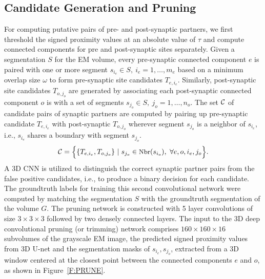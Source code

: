 \documentclass{llncs}
\begin{document}
\subsection{Candidate Generation and Pruning}\label{S:CANDIDATE_PRUNE}
For computing putative pairs of pre- and post-synaptic partners, we first threshold the signed proximity values at an absolute value of $\tau$ and compute connected components for pre and post-synaptic sites separately. Given a segmentation $S$ for the EM volume, every pre-synaptic connected component $e$ is paired with one or more segment $s_{i_e} \in S,~ i_e = 1, \dots, m_e $ based on a minimum overlap size $\omega$ to form pre-synaptic site candidates $T_{e,{i_e}}$. Similarly, post-synaptic site candidates $T_{o,{j_o}}$ are generated by associating each post-synaptic connected component $o$ is with a set of segments $ s_{j_o} \in S,~ j_o = 1, \dots, n_o$. The set $\cal C$ of candidate pairs of synaptic partners are computed by pairing up pre-synaptic candidate $T_{e,{i_e}}$  with post-synaptic $T_{o,{j_o}}$ wherever segment $s_{j_o}$ is a neighbor of $s_{i_e}$, i.e., $s_{i_e}$ shares a boundary with segment $s_{j_o}$.
\vspace{-0.2cm}
\begin{equation}
\small {\cal C} = \Bigl \{ \{ T_{e,{i_e}}, T_{o,{j_o}} \}~|~ s_{j_o} \in \text{Nbr}(s_{i_o}), ~\forall {e, o, i_e, j_o} \Bigr \}. 
\vspace{-0.2cm}
\end{equation}
A 3D CNN is utilized to distinguish  the correct synaptic partner pairs from the false positive candidates, i.e., to produce a binary decision for each candidate. The groundtruth labels for training this second convolutional network were computed by matching the segmentation $S$ with the groundtruth segmentation of the volume $G$. The pruning network is constructed with 5 layer convolutions of size $3 \times 3 \times 3$ followed by two densely connected layers. The input to the 3D deep convolutional pruning (or trimming) network comprises $160\times 160\times 16$ subvolumes of  the grayscale EM image, the predicted signed proximity values from 3D U-net and the segmentation masks of $s_{i_e}, s_{j_o}$, extracted from a 3D window centered at the closest point between the connected components $e$ and $o$, as shown in Figure~\ref{F:PRUNE}. 
\end{document}
